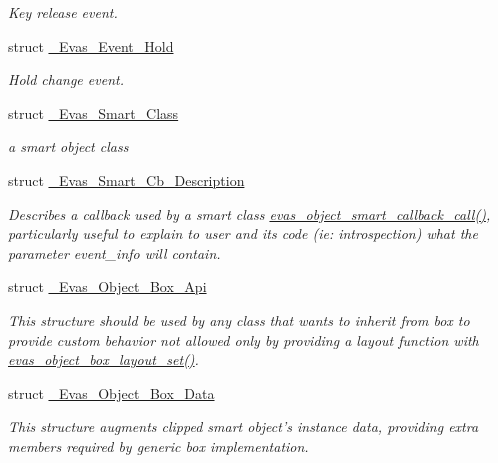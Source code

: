\begin{DoxyCompactItemize}
\begin{DoxyCompactList}\small\item\em Key release event. \item\end{DoxyCompactList}\item 
struct \hyperlink{struct__Evas__Event__Hold}{\_\-Evas\_\-Event\_\-Hold}
\begin{DoxyCompactList}\small\item\em Hold change event. \item\end{DoxyCompactList}\item 
struct \hyperlink{struct__Evas__Smart__Class}{\_\-Evas\_\-Smart\_\-Class}
\begin{DoxyCompactList}\small\item\em a smart object class \item\end{DoxyCompactList}\item 
struct \hyperlink{struct__Evas__Smart__Cb__Description}{\_\-Evas\_\-Smart\_\-Cb\_\-Description}
\begin{DoxyCompactList}\small\item\em Describes a callback used by a smart class \hyperlink{group__Evas__Smart__Object__Group_ga17bbe660f5bf9d8997913b08882f6f9e}{evas\_\-object\_\-smart\_\-callback\_\-call()}, particularly useful to explain to user and its code (ie: introspection) what the parameter {\ttfamily event\_\-info} will contain. \item\end{DoxyCompactList}\item 
struct \hyperlink{struct__Evas__Object__Box__Api}{\_\-Evas\_\-Object\_\-Box\_\-Api}
\begin{DoxyCompactList}\small\item\em This structure should be used by any class that wants to inherit from box to provide custom behavior not allowed only by providing a layout function with \hyperlink{group__Evas__Object__Box_ga2116d23c11ab08d7c50cbcb588de5570}{evas\_\-object\_\-box\_\-layout\_\-set()}. \item\end{DoxyCompactList}\item 
struct \hyperlink{struct__Evas__Object__Box__Data}{\_\-Evas\_\-Object\_\-Box\_\-Data}
\begin{DoxyCompactList}\small\item\em This structure augments clipped smart object's instance data, providing extra members required by generic box implementation. \item\end{DoxyCompactList}\item 

\end{DoxyCompactItemize}
